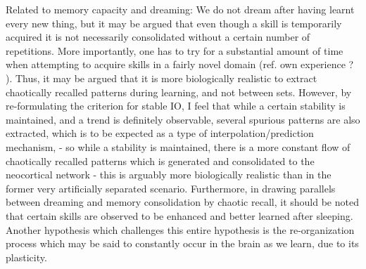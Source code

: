 Related to memory capacity and dreaming: We do not dream after having learnt every new thing, but it may be argued that even though a skill is temporarily acquired it is not necessarily consolidated without a certain number of repetitions. More importantly, one has to try for a substantial amount of time when attempting to acquire skills in a fairly novel domain (ref. own experience ? ). Thus, it may be argued that it is more biologically realistic to extract chaotically recalled patterns during learning, and not between sets. However, by re-formulating the criterion for stable IO, I feel that while a certain stability is maintained, and a trend is definitely observable, several spurious patterns are also extracted, which is to be expected as a type of interpolation/prediction mechanism, - so while a stability is maintained, there is a more constant flow of chaotically recalled patterns which is generated and consolidated to the neocortical network - this is arguably more biologically realistic than in the former very artificially separated scenario.
Furthermore, in drawing parallels between dreaming and memory consolidation by chaotic recall, it should be noted that certain skills are observed to be enhanced and better learned after sleeping. Another hypothesis which challenges this entire hypothesis is the re-organization process which may be said to constantly occur in the brain as we learn, due to its plasticity.







\cleardoublepage